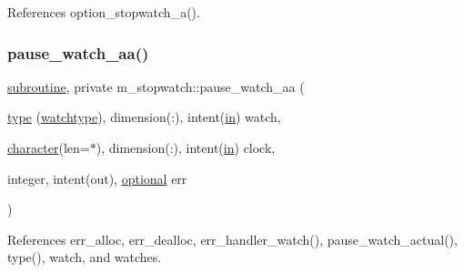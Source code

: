 References option\+\_\+stopwatch\+\_\+a().

\mbox{\label{namespacem__stopwatch_a7ebcc1a6c6636aa2ff91b549b68dfcca}} 
\subsubsection{\texorpdfstring{pause\+\_\+watch\+\_\+aa()}{pause\_watch\_aa()}}
{\footnotesize\ttfamily \hyperlink{M__stopwatch_83_8txt_acfbcff50169d691ff02d4a123ed70482}{subroutine}, private m\+\_\+stopwatch\+::pause\+\_\+watch\+\_\+aa (\begin{DoxyParamCaption}\item[{\hyperlink{stop__watch_83_8txt_a70f0ead91c32e25323c03265aa302c1c}{type} (\hyperlink{structm__stopwatch_1_1watchtype}{watchtype}), dimension(\+:), intent(\hyperlink{M__journal_83_8txt_afce72651d1eed785a2132bee863b2f38}{in})}]{watch,  }\item[{\hyperlink{option__stopwatch_83_8txt_abd4b21fbbd175834027b5224bfe97e66}{character}(len=$\ast$), dimension(\+:), intent(\hyperlink{M__journal_83_8txt_afce72651d1eed785a2132bee863b2f38}{in})}]{clock,  }\item[{integer, intent(out), \hyperlink{option__stopwatch_83_8txt_aa4ece75e7acf58a4843f70fe18c3ade5}{optional}}]{err }\end{DoxyParamCaption})\hspace{0.3cm}{\ttfamily [private]}}



References err\+\_\+alloc, err\+\_\+dealloc, err\+\_\+handler\+\_\+watch(), pause\+\_\+watch\+\_\+actual(), type(), watch, and watches.

\mbox{\label{namespacem__stopwatch_a7c4ebc164b1871203ab72693f73038c0}} 
